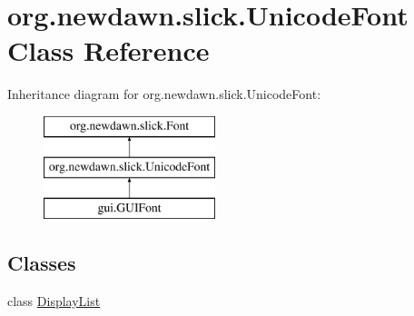 \hypertarget{classorg_1_1newdawn_1_1slick_1_1_unicode_font}{}\section{org.\+newdawn.\+slick.\+Unicode\+Font Class Reference}
\label{classorg_1_1newdawn_1_1slick_1_1_unicode_font}
Inheritance diagram for org.\+newdawn.\+slick.\+Unicode\+Font\+:\begin{figure}[H]
\begin{center}
\leavevmode
\includegraphics[height=3.000000cm]{classorg_1_1newdawn_1_1slick_1_1_unicode_font}
\end{center}
\end{figure}
\subsection*{Classes}
\begin{DoxyCompactItemize}
\item 
class \mbox{\hyperlink{classorg_1_1newdawn_1_1slick_1_1_unicode_font_1_1_display_list}{Display\+List}}
\end{DoxyCompactItemize}

